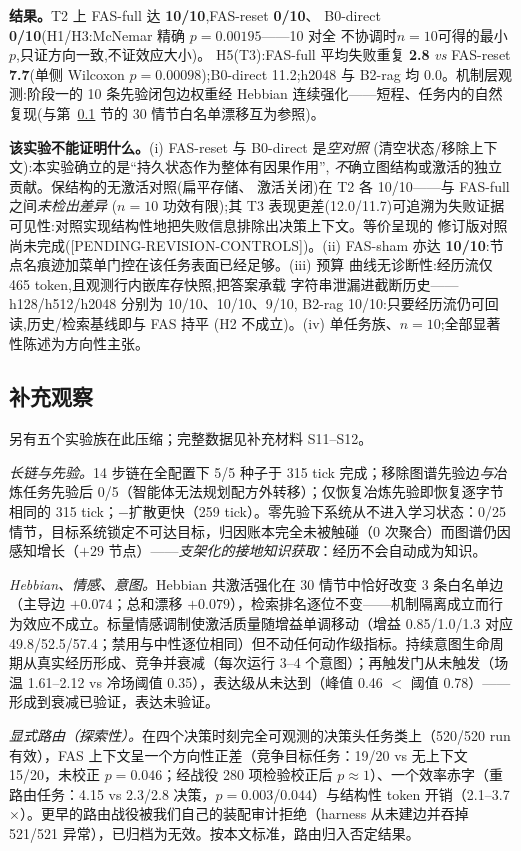 \documentclass[10pt,a4paper]{ctexart}
\begin{document}
\textbf{结果。}T2 上 FAS-full 达 \textbf{10/10},FAS-reset \textbf{0/10}、
B0-direct \textbf{0/10}(H1/H3:McNemar 精确 $p{=}0.00195$——10 对全
不协调时$n{=}10$可得的最小 $p$,只证方向一致,不证效应大小)。
H5(T3):FAS-full 平均失败重复 \textbf{2.8} \emph{vs} FAS-reset
\textbf{7.7}(单侧 Wilcoxon $p{=}0.00098$);B0-direct 11.2;h2048 与
B2-rag 均 0.0。机制层观测:阶段一的 10 条先验闭包边权重经 Hebbian
连续强化——短程、任务内的自然复现(与第~\ref{sec:res-system} 节的
30 情节白名单漂移互为参照)。

\textbf{该实验不能证明什么。}(i) FAS-reset 与 B0-direct 是\emph{空对照}
(清空状态/移除上下文):本实验确立的是``持久状态作为整体有因果作用'',
\emph{不}确立图结构或激活的独立贡献。保结构的无激活对照(扁平存储、
激活关闭)在 T2 各 10/10——与 FAS-full 之间\emph{未检出差异}
($n{=}10$ 功效有限);其 T3 表现更差(12.0/11.7)可追溯为失败证据
可见性:对照实现结构性地把失败信息排除出决策上下文。等价呈现的
修订版对照尚未完成([PENDING-REVISION-CONTROLS])。(ii) FAS-sham 亦达
\textbf{10/10}:节点名痕迹加菜单门控在该任务表面已经足够。(iii) 预算
曲线无诊断性:经历流仅 465 token,且观测行内嵌库存快照,把答案承载
字符串泄漏进截断历史——h128/h512/h2048 分别为 10/10、10/10、9/10,
B2-rag 10/10:只要经历流仍可回读,历史/检索基线即与 FAS 持平
(H2 不成立)。(iv) 单任务族、$n{=}10$;全部显著性陈述为方向性主张。

\subsection{补充观察}
\label{sec:res-system}
另有五个实验族在此压缩；完整数据见补充材料 S11--S12。

\emph{长链与先验。}14 步链在全配置下 5/5 种子于 315 tick 完成；移除图谱先验边\emph{与}冶炼任务先验后 0/5（智能体无法规划配方外转移）；仅恢复冶炼先验即恢复逐字节相同的 315 tick；$-$扩散更快（259 tick）。零先验下系统从不进入学习状态：0/25 情节，目标系统锁定不可达目标，归因账本完全未被触碰（0 次聚合）而图谱仍因感知增长（$+29$ 节点）——\emph{支架化的接地知识获取}：经历不会自动成为知识。

\emph{Hebbian、情感、意图。}Hebbian 共激活强化在 30 情节中恰好改变 3 条白名单边（主导边 $+0.074$；总和漂移 $+0.079$），检索排名逐位不变——机制隔离成立而行为效应不成立。标量情感调制使激活质量随增益单调移动（增益 0.85/1.0/1.3 对应 49.8/52.5/57.4；禁用与中性逐位相同）但不动任何动作级指标。持续意图生命周期从真实经历形成、竞争并衰减（每次运行 3--4 个意图）；再触发门从未触发（场温 1.61--2.12 vs 冷场阈值 0.35），表达级从未达到（峰值 0.46 $<$ 阈值 0.78）——形成到衰减已验证，表达未验证。

\emph{显式路由（探索性）。}在四个决策时刻完全可观测的决策头任务类上（520/520 run 有效），FAS 上下文呈一个方向性正差（竞争目标任务：19/20 vs 无上下文 15/20，未校正 $p{=}0.046$；经战役 280 项检验校正后 $p{\approx}1$）、一个效率赤字（重路由任务：4.15 vs 2.3/2.8 决策，$p{=}0.003$/$0.044$）与结构性 token 开销（2.1--3.7$\times$）。更早的路由战役被我们自己的装配审计拒绝（harness 从未建边并吞掉 521/521 异常），已归档为无效。按本文标准，路由归入否定结果。
\end{document}
